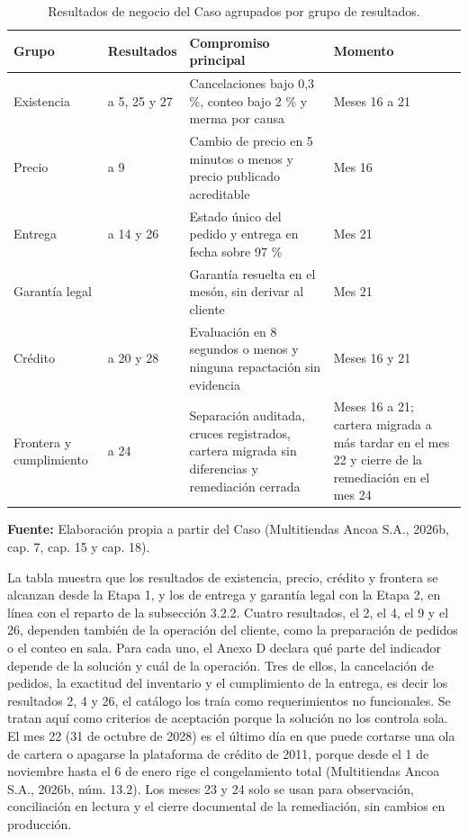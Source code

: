 \documentclass[11pt]{article}
\begin{document}
\begin{longtable}[]{@{}
  >{\raggedright\arraybackslash}p{}
  >{\raggedright\arraybackslash}p{}
  >{\raggedright\arraybackslash}p{}
  >{\raggedright\arraybackslash}p{}@{}}
\caption{Resultados de negocio del Caso agrupados por grupo de resultados.}\label{tab:3-6}\\
\toprule\noalign{}
Grupo & Resultados & Compromiso principal & Momento \\
\midrule\noalign{}
\endhead
\bottomrule\noalign{}
\endlastfoot
Existencia & 1 a 5, 25 y 27 & Cancelaciones bajo 0,3 \%, conteo bajo 2 \% y merma por causa & Meses 16 a 21 \\
Precio & 6 a 9 & Cambio de precio en 5 minutos o menos y precio publicado acreditable & Mes 16 \\
Entrega & 10 a 14 y 26 & Estado único del pedido y entrega en fecha sobre 97 \% & Mes 21 \\
Garantía legal & 15 & Garantía resuelta en el mesón, sin derivar al cliente & Mes 21 \\
Crédito & 16 a 20 y 28 & Evaluación en 8 segundos o menos y ninguna repactación sin evidencia & Meses 16 y 21 \\
Frontera y cumplimiento & 21 a 24 & Separación auditada, cruces registrados, cartera migrada sin diferencias y remediación cerrada & Meses 16 a 21; cartera migrada a más tardar en el mes 22 y cierre de la remediación en el mes 24 \\
\end{longtable}

{\raggedright\textbf{Fuente:} Elaboración propia a partir del Caso (Multitiendas Ancoa S.A., 2026b, cap. 7, cap. 15 y cap. 18).\par}

La tabla muestra que los resultados de existencia, precio, crédito y frontera se alcanzan desde la Etapa 1, y los de entrega y garantía legal con la Etapa 2, en línea con el reparto de la subsección 3.2.2. Cuatro resultados, el 2, el 4, el 9 y el 26, dependen también de la operación del cliente, como la preparación de pedidos o el conteo en sala. Para cada uno, el Anexo D declara qué parte del indicador depende de la solución y cuál de la operación. Tres de ellos, la cancelación de pedidos, la exactitud del inventario y el cumplimiento de la entrega, es decir los resultados 2, 4 y 26, el catálogo los traía como requerimientos no funcionales. Se tratan aquí como criterios de aceptación porque la solución no los controla sola. El mes 22 (31 de octubre de 2028) es el último día en que puede cortarse una ola de cartera o apagarse la plataforma de crédito de 2011, porque desde el 1 de noviembre hasta el 6 de enero rige el congelamiento total (Multitiendas Ancoa S.A., 2026b, núm. 13.2). Los meses 23 y 24 solo se usan para observación, conciliación en lectura y el cierre documental de la remediación, sin cambios en producción.
\end{document}
